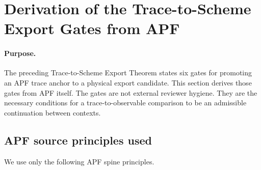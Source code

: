 \section{Derivation of the Trace-to-Scheme Export Gates from APF}
\label{sec:g1-g6-apf-derivation}

\paragraph{Purpose.}
The preceding Trace-to-Scheme Export Theorem states six gates for promoting an APF trace anchor to a physical export candidate.  This section derives those gates from APF itself.  The gates are not external reviewer hygiene.  They are the necessary conditions for a trace-to-observable comparison to be an admissible continuation between contexts.

\subsection{APF source principles used}

We use only the following APF spine principles.

